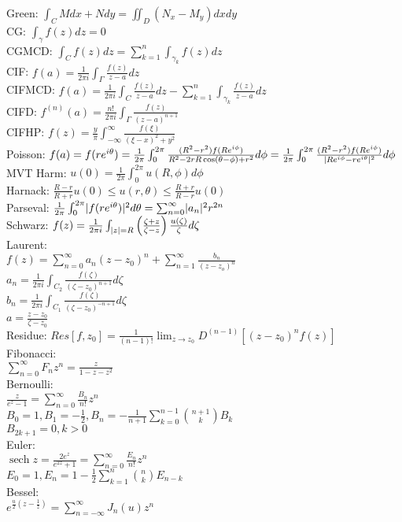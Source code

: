 \documentclass[letterpaper,12pt,fleqn,twocolumn]{article}
\renewcommand{\o}{\theta}
\newcommand{\p}{\phi}
\newcommand{\g}{\gamma}
\newcommand{\G}{\Gamma}
\newcommand{\z}{\zeta}
\newcommand{\x}{\xi}
\DeclareMathOperator{\sech}{sech}
\begin{document}
Green: $\int_CMdx+Ndy=\iint_D(N_x-M_y)dxdy$ \\
CG: $\int_{\g}f(z)dz=0$ \\
CGMCD: $\int_{C}f(z)dz=\sum_{k=1}^n\int_{\g_k}f(z)dz$ \\
CIF: $f(a)=\frac{1}{2\pi i}\int_{\G}\frac{f(z)}{z-a}dz$ \\
CIFMCD: $f(a)=\frac{1}{2\pi i}\int_C\frac{f(z)}{z-a}dz-
\sum_{k=1}^n\int_{\g_k}\frac{f(z)}{z-a}dz$ \\
CIFD: $f^{(n)}(a)=\frac{n!}{2\pi i}\int_{\G}\frac{f(z)}{(z-a)^{n+1}}$ \\
CIFHP: $f(z)=\frac{y}{\pi}\int_{-\infty}^{\infty}\frac{f(\x)}{(\x-x)^2+y^2}$ \\
Poisson: $f(a)=f(re^{i\o})=\frac{1}{2\pi}
\int_0^{2\pi}\frac{(R^2-r^2)f(Re^{i\p})}{R^2-2rR\cos(\o-\p)+r^2}d\p=
\frac{1}{2\pi}\int_0^{2\pi}\frac{(R^2-r^2)f(Re^{i\p})}
     {\abs{Re^{i\p}-re^{i\o}}^2}d\p$ \\
MVT Harm: $u(0)=\frac{1}{2\pi}\int_0^{2\pi}u(R,\p)d\p$ \\
Harnack: $\frac{R-r}{R+r}u(0)\le u(r,\o)\le\frac{R+r}{R-r}u(0)$ \\
Parseval: $\frac{1}{2\pi}\int_0^{2\pi}\abs{f(re^{i\o})}^2d\o=
\sum_{n=0}^{\infty}\abs{a_n}^2r^{2n}$ \\
Schwarz: $f(z)=\frac{1}{2\pi i}\int_{\abs{z}=R}\left(\frac{\z+z}{\z-z}\right)
\frac{u(\z)}{\z}d\z$ \\
Laurent: \\
$f(z)=\sum_{n=0}^{\infty}a_n(z-z_0)^n+\sum_{n=1}^{\infty}\frac{b_n}{(z-z_o)^n}$ \\
$a_n=\frac{1}{2\pi i}\int_{C_2}\frac{f(\z)}{(\z-z_0)^{n+1}}d\z$ \\
$b_n=\frac{1}{2\pi i}\int_{C_1}\frac{f(\z)}{(\z-z_0)^{-n+1}}d\z$ \\
$a=\frac{z-z_0}{\z-z_0}$ \\
Residue: $Res[f,z_0]=\frac{1}{(n-1)!}\lim_{z\to z_0}D^{(n-1)}[(z-z_0)^nf(z)]$ \\
Fibonacci: \\
$\sum_{n=0}^{\infty}F_nz^n=\frac{z}{1-z-z^2}$ \\
Bernoulli:\\
$\frac{z}{e^z-1}=\sum_{n=0}^{\infty}\frac{B_n}{n!}z^n$ \\
$B_0=1, B_1=-\frac{1}{2}, B_n=-\frac{1}{n+1}\sum_{k=0}^{n-1}\binom{n+1}{k}B_k$ \\
$B_{2k+1}=0,k>0$ \\
Euler: \\
$\sech{z}=\frac{2e^z}{e^{2z}+1}=\sum_{n=0}^{\infty}\frac{E_n}{n!}z^n$ \\
$E_0=1, E_n=1-\frac{1}{2}\sum_{k=1}^n\binom{n}{k}E_{n-k}$ \\
Bessel: \\
$e^{\frac{u}{2}(z-\frac{1}{z})}=\sum_{n=-\infty}^{\infty}J_n(u)z^n$ \\
\end{document}
